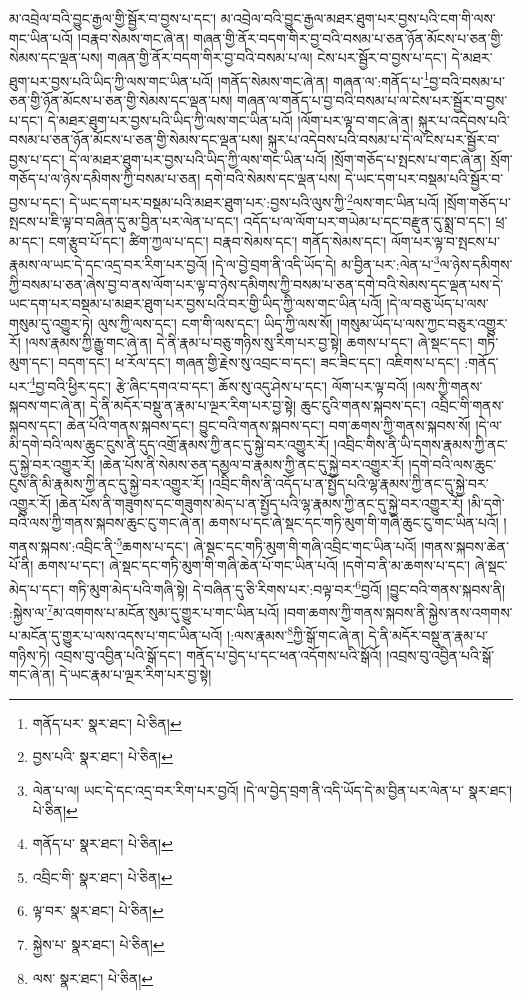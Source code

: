མ་འབྲེལ་བའི་བྱུང་རྒྱལ་གྱི་སྦྱོར་བ་བྱས་པ་དང་། མ་འབྲེལ་བའི་བྱུང་རྒྱལ་མཐར་ཐུག་པར་བྱས་པའི་ངག་གི་ལས་གང་ཡིན་པའོ། །བརྣབ་སེམས་གང་ཞེ་ན། གཞན་གྱི་ནོར་བདག་གིར་བྱ་བའི་བསམ་པ་ཅན་ཉོན་མོངས་པ་ཅན་གྱི་སེམས་དང་ལྡན་པས། གཞན་གྱི་ནོར་བདག་གིར་བྱ་བའི་བསམ་པ་ལ། ངེས་པར་སྦྱོར་བ་བྱས་པ་དང་། དེ་མཐར་ཐུག་པར་བྱས་པའི་ཡིད་ཀྱི་ལས་གང་ཡིན་པའོ། །གནོད་སེམས་གང་ཞེ་ན། གཞན་ལ་:གནོད་པ་\footnote{གནོད་པར་  སྣར་ཐང་།  པེ་ཅིན། }བྱ་བའི་བསམ་པ་ཅན་གྱི་ཉོན་མོངས་པ་ཅན་གྱི་སེམས་དང་ལྡན་པས། གཞན་ལ་གནོད་པ་བྱ་བའི་བསམ་པ་ལ་ངེས་པར་སྦྱོར་བ་བྱས་པ་དང་། དེ་མཐར་ཐུག་པར་བྱས་པའི་ཡིད་ཀྱི་ལས་གང་ཡིན་པའོ། །ལོག་པར་ལྟ་བ་གང་ཞེ་ན། སྐུར་པ་འདེབས་པའི་བསམ་པ་ཅན་ཉོན་མོངས་པ་ཅན་གྱི་སེམས་དང་ལྡན་པས། སྐུར་པ་འདེབས་པའི་བསམ་པ་དེ་ལ་ངེས་པར་སྦྱོར་བ་བྱས་པ་དང་། དེ་ལ་མཐར་ཐུག་པར་བྱས་པའི་ཡིད་ཀྱི་ལས་གང་ཡིན་པའོ། །སྲོག་གཅོད་པ་སྤངས་པ་གང་ཞེ་ན། སྲོག་གཅོད་པ་ལ་ཉེས་དམིགས་ཀྱི་བསམ་པ་ཅན། དགེ་བའི་སེམས་དང་ལྡན་པས། དེ་ཡང་དག་པར་བསྡམ་པའི་སྦྱོར་བ་བྱས་པ་དང་། དེ་ཡང་དག་པར་བསྡམ་པའི་མཐར་ཐུག་པར་:བྱས་པའི་ལུས་ཀྱི་\footnote{བྱས་པའི་  སྣར་ཐང་།  པེ་ཅིན། }ལས་གང་ཡིན་པའོ། །སྲོག་གཅོད་པ་སྤངས་པ་ཇི་ལྟ་བ་བཞིན་དུ་མ་བྱིན་པར་ལེན་པ་དང་། འདོད་པ་ལ་ལོག་པར་གཡེམ་པ་དང་བརྫུན་དུ་སྨྲ་བ་དང་། ཕྲ་མ་དང་། ངག་རྩུབ་པོ་དང་། ཚིག་ཀྱལ་པ་དང་། བརྣབ་སེམས་དང་། གནོད་སེམས་དང་། ལོག་པར་ལྟ་བ་སྤངས་པ་རྣམས་ལ་ཡང་དེ་དང་འདྲ་བར་རིག་པར་བྱའོ། །དེ་ལ་བྱེ་བྲག་ནི་འདི་ཡོད་དེ། མ་བྱིན་པར་:ལེན་པ་\footnote{ལེན་པ་ལ། ཡང་དེ་དང་འདྲ་བར་རིག་པར་བྱའོ། །དེ་ལ་བྱེད་བྲག་ནི་འདི་ཡོད་དེ་མ་བྱིན་པར་ལེན་པ་  སྣར་ཐང་།  པེ་ཅིན། }ལ་ཉེས་དམིགས་ཀྱི་བསམ་པ་ཅན་ཞེས་བྱ་བ་ནས་ལོག་པར་ལྟ་བ་ཉེས་དམིགས་ཀྱི་བསམ་པ་ཅན་དགེ་བའི་སེམས་དང་ལྡན་པས་དེ་ཡང་དག་པར་བསྡམ་པ་མཐར་ཐུག་པར་བྱས་པའི་བར་གྱི་ཡིད་ཀྱི་ལས་གང་ཡིན་པའོ། །དེ་ལ་བཅུ་ཡོད་པ་ལས་གསུམ་དུ་འགྱུར་ཏེ། ལུས་ཀྱི་ལས་དང་། ངག་གི་ལས་དང་། ཡིད་ཀྱི་ལས་སོ། །གསུམ་ཡོད་པ་ལས་ཀྱང་བཅུར་འགྱུར་རོ། །ལས་རྣམས་ཀྱི་རྒྱུ་གང་ཞེ་ན། དེ་ནི་རྣམ་པ་བཅུ་གཉིས་སུ་རིག་པར་བྱ་སྟེ། ཆགས་པ་དང་། ཞེ་སྡང་དང་། གཏི་མུག་དང་། བདག་དང་། ཕ་རོལ་དང་། གཞན་གྱི་རྗེས་སུ་འབྲང་བ་དང་། ཟང་ཟིང་དང་། འཇིགས་པ་དང་། :གནོད་པར་\footnote{གནོད་པ་  སྣར་ཐང་།  པེ་ཅིན། }བྱ་བའི་ཕྱིར་དང་། རྩེ་ཞིང་དགའ་བ་དང་། ཆོས་སུ་འདུ་ཤེས་པ་དང་། ལོག་པར་ལྟ་བའོ། །ལས་ཀྱི་གནས་སྐབས་གང་ཞེ་ན། དེ་ནི་མདོར་བསྡུ་ན་རྣམ་པ་ལྔར་རིག་པར་བྱ་སྟེ། ཆུང་ངུའི་གནས་སྐབས་དང་། འབྲིང་གི་གནས་སྐབས་དང་། ཆེན་པོའི་གནས་སྐབས་དང་། བྱུང་བའི་གནས་སྐབས་དང་། བག་ཆགས་ཀྱི་གནས་སྐབས་སོ། །དེ་ལ་མི་དགེ་བའི་ལས་ཆུང་ངུས་ནི་དུད་འགྲོ་རྣམས་ཀྱི་ནང་དུ་སྐྱེ་བར་འགྱུར་རོ། །འབྲིང་གིས་ནི་ཡི་དགས་རྣམས་ཀྱི་ནང་དུ་སྐྱེ་བར་འགྱུར་རོ། །ཆེན་པོས་ནི་སེམས་ཅན་དམྱལ་བ་རྣམས་ཀྱི་ནང་དུ་སྐྱེ་བར་འགྱུར་རོ། །དགེ་བའི་ལས་ཆུང་ངུས་ནི་མི་རྣམས་ཀྱི་ནང་དུ་སྐྱེ་བར་འགྱུར་རོ། །འབྲིང་གིས་ནི་འདོད་པ་ན་སྤྱོད་པའི་ལྷ་རྣམས་ཀྱི་ནང་དུ་སྐྱེ་བར་འགྱུར་རོ། །ཆེན་པོས་ནི་གཟུགས་དང་གཟུགས་མེད་པ་ན་སྤྱོད་པའི་ལྷ་རྣམས་ཀྱི་ནང་དུ་སྐྱེ་བར་འགྱུར་རོ། །མི་དགེ་བའི་ལས་ཀྱི་གནས་སྐབས་ཆུང་ངུ་གང་ཞེ་ན། ཆགས་པ་དང་ཞེ་སྡང་དང་གཏི་མུག་གི་གཞི་ཆུང་ངུ་གང་ཡིན་པའོ། །གནས་སྐབས་:འབྲིང་ནི་\footnote{འབྲིང་གི་  སྣར་ཐང་།  པེ་ཅིན། }ཆགས་པ་དང་། ཞེ་སྡང་དང་གཏི་མུག་གི་གཞི་འབྲིང་གང་ཡིན་པའོ། །གནས་སྐབས་ཆེན་པོ་ནི། ཆགས་པ་དང་། ཞེ་སྡང་དང་གཏི་མུག་གི་གཞི་ཆེན་པོ་གང་ཡིན་པའོ། །དགེ་བ་ནི་མ་ཆགས་པ་དང་། ཞེ་སྡང་མེད་པ་དང་། གཏི་མུག་མེད་པའི་གཞི་སྟེ། དེ་བཞིན་དུ་ཅི་རིགས་པར་:བལྟ་བར་\footnote{ལྟ་བར་  སྣར་ཐང་།  པེ་ཅིན། }བྱའོ། །བྱུང་བའི་གནས་སྐབས་ནི། :སྐྱེས་ལ་\footnote{སྐྱེས་པ་  སྣར་ཐང་།  པེ་ཅིན། }མ་འགགས་པ་མངོན་སུམ་དུ་གྱུར་པ་གང་ཡིན་པའོ། །བག་ཆགས་ཀྱི་གནས་སྐབས་ནི་སྐྱེས་ནས་འགགས་པ་མངོན་དུ་གྱུར་པ་ལས་འདས་པ་གང་ཡིན་པའོ། །:ལས་རྣམས་\footnote{ལས་  སྣར་ཐང་།  པེ་ཅིན། }ཀྱི་སྒོ་གང་ཞེ་ན། དེ་ནི་མདོར་བསྡུ་ན་རྣམ་པ་གཉིས་ཏེ། འབྲས་བུ་འབྱིན་པའི་སྒོ་དང་། གནོད་པ་བྱེད་པ་དང་ཕན་འདོགས་པའི་སྒོའོ། །འབྲས་བུ་འབྱིན་པའི་སྒོ་གང་ཞེ་ན། དེ་ཡང་རྣམ་པ་ལྔར་རིག་པར་བྱ་སྟེ། 